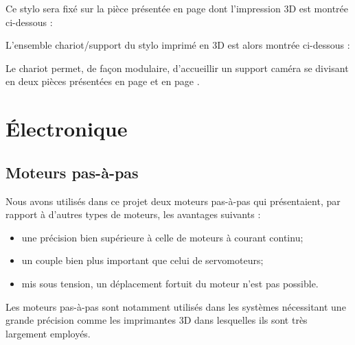 \documentclass[12pt,a4paper]{report}
\begin{document}
	
	Ce stylo sera fixé sur la pièce présentée en page \pageref{supportstylo} dont l'impression 3D est montrée ci-dessous :
	
	
L'ensemble chariot/support du stylo imprimé en 3D est alors montrée ci-dessous :


Le chariot permet, de façon modulaire, d'accueillir un support caméra se divisant en deux pièces présentées en page \pageref{chariotcamera} et en page \pageref{supportcamera}.
	

	\chapter{Électronique}
\section{Moteurs pas-à-pas}
\label{Elec_stepper}
Nous avons utilisés dans ce projet deux moteurs pas-à-pas qui présentaient, par rapport à d'autres types de moteurs, les avantages suivants : 
\begin{itemize}[label=--]
\item une précision bien supérieure à celle de moteurs à courant continu;
\item un couple bien plus important que celui de servomoteurs;
\item mis sous tension, un déplacement fortuit du moteur n'est pas possible.
\end{itemize}
Les moteurs pas-à-pas sont notamment utilisés dans les systèmes nécessitant une grande précision comme les imprimantes 3D dans lesquelles ils sont très largement employés.
\end{document}
